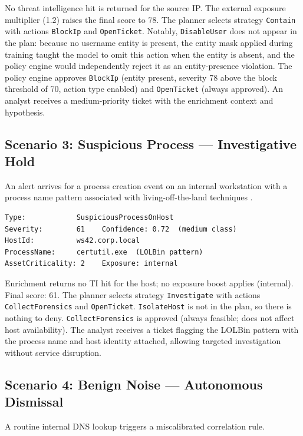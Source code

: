 No threat intelligence hit is returned for the source IP. The external exposure multiplier (1.2) raises the final score to 78. The planner selects strategy \texttt{Contain} with actions \texttt{BlockIp} and \texttt{OpenTicket}. Notably, \texttt{DisableUser} does not appear in the plan: because no username entity is present, the entity mask applied during training taught the model to omit this action when the entity is absent, and the policy engine would independently reject it as an entity-presence violation. The policy engine approves \texttt{BlockIp} (entity present, severity 78 above the block threshold of 70, action type enabled) and \texttt{OpenTicket} (always approved). An analyst receives a medium-priority ticket with the enrichment context and hypothesis.

\subsection{Scenario 3: Suspicious Process --- Investigative Hold}

An alert arrives for a process creation event on an internal workstation with a process name pattern associated with living-off-the-land techniques \cite{strom2018attack}.

\begin{verbatim}
Type:            SuspiciousProcessOnHost
Severity:        61    Confidence: 0.72  (medium class)
HostId:          ws42.corp.local
ProcessName:     certutil.exe  (LOLBin pattern)
AssetCriticality: 2    Exposure: internal
\end{verbatim}

Enrichment returns no TI hit for the host; no exposure boost applies (internal). Final score: 61. The planner selects strategy \texttt{Investigate} with actions \texttt{CollectForensics} and \texttt{OpenTicket}. \texttt{IsolateHost} is not in the plan, so there is nothing to deny. \texttt{CollectForensics} is approved (always feasible; does not affect host availability). The analyst receives a ticket flagging the LOLBin pattern with the process name and host identity attached, allowing targeted investigation without service disruption.

\subsection{Scenario 4: Benign Noise --- Autonomous Dismissal}

A routine internal DNS lookup triggers a miscalibrated correlation rule.


